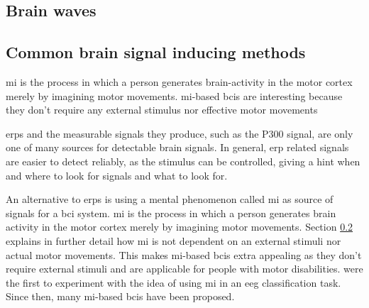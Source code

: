 
\lipsum[1-2]


\subsection{Brain waves}
\label{subsec:biomedical_signals_from_brain_brain_waves}

\lipsum[1-3]


\subsection{Common brain signal inducing methods}
\label{subsec:biomedical_signals_from_brain_inducing_methods}



\lipsum[1-7]

\Gls{mi} is the process in which a person generates brain-activity in the motor cortex merely by imagining motor movements.
\Gls{mi}-based \glspl{bci} are interesting because they don't require any external stimulus nor effective motor movements

\glspl{erp} and the measurable signals they produce, such as the P300 signal, are only one of many sources for detectable brain signals.
In general, \gls{erp} related signals are easier to detect reliably, as the stimulus can be controlled, giving a hint when and where to look for signals and what to look for.

An alternative to \glspl{erp} is using a mental phenomenon called \gls{mi} as source of signals for a \gls{bci} system.
\Gls{mi} is the process in which a person generates brain activity in the motor cortex merely by imagining motor movements.
Section \ref{subsec:biomedical_signals_from_brain_inducing_methods} explains in further detail how \gls{mi} is not dependent on an external stimuli nor actual motor movements.
This makes \gls{mi}-based \glspl{bci} extra appealing as they don't require external stimuli and are applicable for people with motor disabilities.
 were the first to experiment with the idea of using \gls{mi} in an \gls{eeg} classification task.
Since then, many \gls{mi}-based \glspl{bci} have been proposed.

